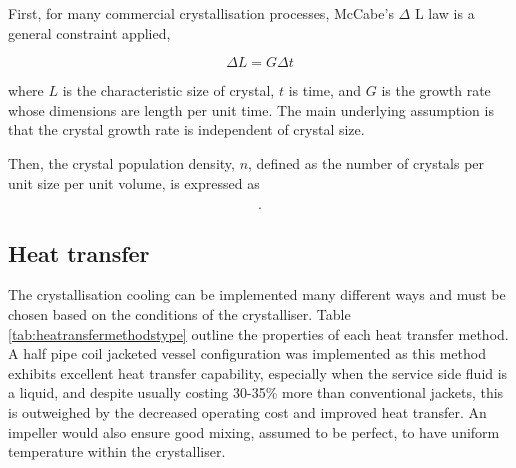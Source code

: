 First, for many commercial crystallisation processes, McCabe's $\Delta$ L law is a general constraint applied,

\begin{equation} \label{eq: McCabe deltaL}
    \Delta L = G \Delta t
\end{equation}

\noindent where $L$ is the characteristic size of crystal, $t$ is time, and $G$ is the growth rate whose dimensions are length per unit time. The main underlying assumption is that the crystal growth rate is independent of crystal size. 

Then, the crystal population density, $n$, defined as the number of crystals per unit size per unit volume, is expressed as 

\begin{equation} \label{eq:crystal population density definition}
    .
\end{equation}






\subsection{Heat transfer}

The crystallisation cooling can be implemented many different ways and must be chosen based on the conditions of the crystalliser. Table \ref{tab:heatransfermethodstype} outline the properties of each heat transfer method. A half pipe coil jacketed vessel configuration was implemented as this method exhibits excellent heat transfer capability, especially when the service side fluid is a liquid, and despite usually costing 30-35\% more than conventional jackets, this is outweighed by the decreased operating cost and improved heat transfer. An impeller would also ensure good mixing, assumed to be perfect, to have uniform temperature within the crystalliser. 

